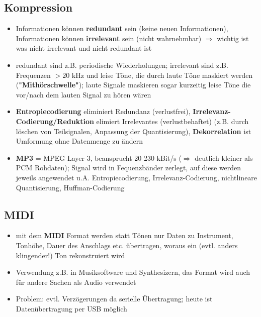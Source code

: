 \documentclass[12pt,landscape]{article}
\begin{document}
\begin{multicols}{3}
\subsection{Kompression}
\begin{itemize}
\item Informationen können \textbf{redundant} sein (keine neuen Informationen), Informationen können \textbf{irrelevant} sein (nicht wahrnehmbar) $\Rightarrow$ wichtig ist was nicht irrelevant und nicht redundant ist
\item redundant sind z.B. periodische Wiederholungen; irrelevant sind z.B. Frequenzen $>20$ kHz und leise Töne, die durch laute Töne maskiert werden (\textbf{"Mithörschwelle"}); laute Signale maskieren sogar kurzeitig leise Töne die vor/nach dem lauten Signal zu hören wären
\item \textbf{Entropiecodierung} eliminiert Redundanz (verlustfrei), \textbf{Irrelevanz-Codierung/Reduktion} elimiert Irrelevantes (verlustbehaftet) (z.B. durch löschen von Teilsignalen, Anpassung der Quantisierung), \textbf{Dekorrelation} ist Umformung ohne Datenmenge zu ändern
\item \textbf{MP3} = MPEG Layer 3, beansprucht 20-230 kBit/s ($\Rightarrow$ deutlich kleiner als PCM Rohdaten); Signal wird in Fequenzbänder zerlegt, auf diese werden jeweils angewendet u.A. Entropiecodierung, Irrelevanz-Codierung, nichtlineare Quantisierung, Huffman-Codierung
\end{itemize}
\subsection{MIDI}
\begin{itemize}
\item mit dem \textbf{MIDI} Format werden statt Tönen nur Daten zu Instrument, Tonhöhe, Dauer des Anschlags etc. übertragen, woraus ein (evtl. anders klingender!) Ton rekonstruiert wird
\item Verwendung z.B. in Musiksoftware und Synthesizern, das Format wird auch für andere Sachen als Audio verwendet
\item Problem: evtl. Verzögerungen da serielle Übertragung; heute ist Datenübertragung per USB möglich 
\end{itemize}

\end{multicols}
\end{document}
